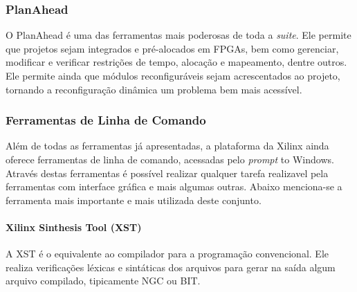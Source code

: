 \documentclass[11pt,a4paper,oneside]{book}
\begin{document}
\subsubsection{PlanAhead}
O PlanAhead é uma das ferramentas mais poderosas de toda a \textit{suite}.
Ele permite que projetos sejam integrados e pré-alocados em FPGAs, bem como gerenciar, modificar e verificar restrições de tempo, alocação e mapeamento, dentre outros.
Ele permite ainda que módulos reconfiguráveis sejam acrescentados ao projeto, tornando a reconfiguração dinâmica um problema bem mais acessível.

\subsubsection{Ferramentas de Linha de Comando}
Além de todas as ferramentas já apresentadas, a plataforma da Xilinx ainda oferece ferramentas de linha de comando, acessadas pelo \textit{prompt} to Windows.
Através destas ferramentas é possível realizar qualquer tarefa realizavel pela ferramentas com interface gráfica e mais algumas outras.
Abaixo menciona-se a ferramenta mais importante e mais utilizada deste conjunto.

\paragraph{Xilinx Sinthesis Tool (XST)}
A XST é o equivalente ao compilador para a programação convencional.
Ele realiza verificações léxicas e sintáticas dos arquivos para gerar na saída algum arquivo compilado, tipicamente NGC ou BIT.

\ifx\compilewholereport\undefined
	 
	\newsavebox\mytempbib\savebox\mytempbib{\parbox{\textwidth}{}}
	
\end{document}
